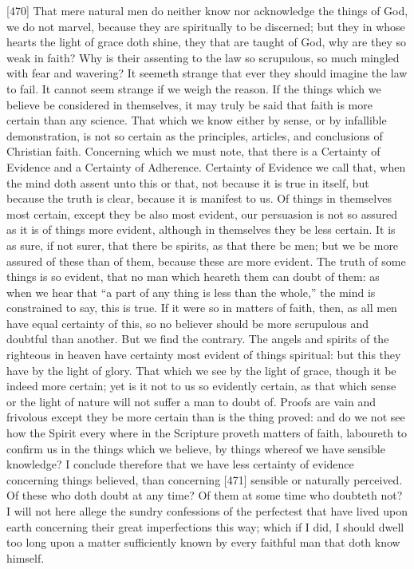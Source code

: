 [470]
That mere natural men do neither know nor acknowledge the things of God, we do not marvel, because they are spiritually to be discerned; but they in whose hearts the light of grace doth shine, they that are taught of God, why are they so weak in faith? Why is their assenting to the law so scrupulous, so much mingled with fear and wavering? It seemeth strange that ever they should imagine the law to fail. It cannot seem strange if we weigh the reason. If the things which we believe be considered in themselves, it may truly be said that faith is more certain than any science. That which we know either by sense, or by infallible demonstration, is not so certain as the principles, articles, and conclusions of Christian faith. Concerning which we must note, that there is a Certainty of Evidence and a Certainty of Adherence. Certainty of Evidence we call that, when the mind doth assent unto this or that, not because it is true in itself, but because the truth is clear, because it is manifest to us. Of things in themselves most certain, except they be also most evident, our persuasion is not so assured as it is of things more evident, although in themselves they be less certain. It is as sure, if not surer, that there be spirits, as that there be men; but we be more assured of these than of them, because these are more evident. The truth of some things is so evident, that no man which heareth them can doubt of them: as when we hear that “a part of any thing is less than the whole,” the mind is constrained to say, this is true. If it were so in matters of faith, then, as all men have equal certainty of this, so no believer should be more scrupulous and doubtful than another. But we find the contrary. The angels and spirits of the righteous in heaven have certainty most evident of things spiritual: but this they have by the light of glory. That which we see by the light of grace, though it be indeed more certain; yet is it not to us so evidently certain, as that which sense or the light of nature will not suffer a man to doubt of. Proofs are vain and frivolous except they be more certain than is the thing proved: and do we not see how the Spirit every where in the Scripture proveth matters of faith, laboureth to confirm us in the things which we believe, by things whereof we have sensible knowledge? I conclude therefore that we have less certainty of evidence concerning things believed, than concerning [471] sensible or naturally perceived. Of these who doth doubt at any time? Of them at some time who doubteth not? I will not here allege the sundry confessions of the perfectest that have lived upon earth concerning their great imperfections this way; which if I did, I should dwell too long upon a matter sufficiently known by every faithful man that doth know himself.


